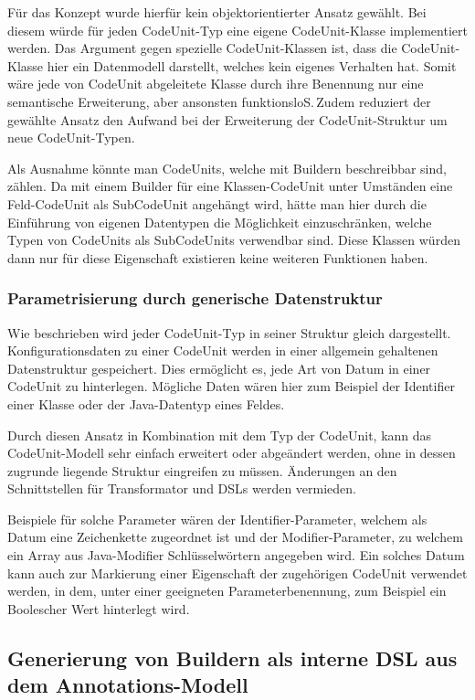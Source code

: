 \documentclass[12pt,oneside,a4paper,parskip]{scrbook}
\begin{document}
Für das Konzept wurde hierfür kein objektorientierter Ansatz gewählt. Bei diesem würde für jeden CodeUnit-Typ eine eigene CodeUnit-Klasse implementiert werden. Das Argument gegen spezielle CodeUnit-Klassen ist, dass die CodeUnit-Klasse hier ein Datenmodell darstellt, welches kein eigenes Verhalten hat. Somit wäre jede von CodeUnit abgeleitete Klasse durch ihre Benennung nur eine semantische Erweiterung, aber ansonsten funktionsloS.\,Zudem reduziert der gewählte Ansatz den Aufwand bei der Erweiterung der CodeUnit-Struktur um neue CodeUnit-Typen.

Als Ausnahme könnte man CodeUnits, welche mit Buildern beschreibbar sind, zählen. Da mit einem Builder für eine Klassen-CodeUnit unter Umständen eine Feld-CodeUnit als SubCodeUnit angehängt wird, hätte man hier durch die Einführung von eigenen Datentypen die Möglichkeit einzuschränken, welche Typen von CodeUnits als SubCodeUnits verwendbar sind. Diese Klassen würden dann nur für diese Eigenschaft existieren keine weiteren Funktionen haben.

\subsubsection{Parametrisierung durch generische Datenstruktur}

Wie beschrieben wird jeder CodeUnit-Typ in seiner Struktur gleich dargestellt. Konfigurationsdaten zu einer CodeUnit werden in einer allgemein gehaltenen Datenstruktur gespeichert. Dies ermöglicht es, jede Art von Datum in einer CodeUnit zu hinterlegen. Mögliche Daten wären hier zum Beispiel der Identifier einer Klasse oder der Java-Datentyp eines Feldes.

Durch diesen Ansatz in Kombination mit dem Typ der CodeUnit, kann das CodeUnit-Modell sehr einfach erweitert oder abgeändert werden, ohne in dessen zugrunde liegende Struktur eingreifen zu müssen. Änderungen an den Schnittstellen für Transformator und DSLs werden vermieden.

Beispiele für solche Parameter wären der Identifier-Parameter, welchem als Datum eine Zeichenkette zugeordnet ist und der Modifier-Parameter, zu welchem ein Array aus Java-Modifier Schlüsselwörtern angegeben wird. Ein solches Datum kann auch zur Markierung einer Eigenschaft der zugehörigen CodeUnit verwendet werden, in dem, unter einer geeigneten Parameterbenennung, zum Beispiel ein Boolescher Wert hinterlegt wird.

\subsection{Generierung von Buildern als interne DSL aus dem Annotations-Modell}
\end{document}
